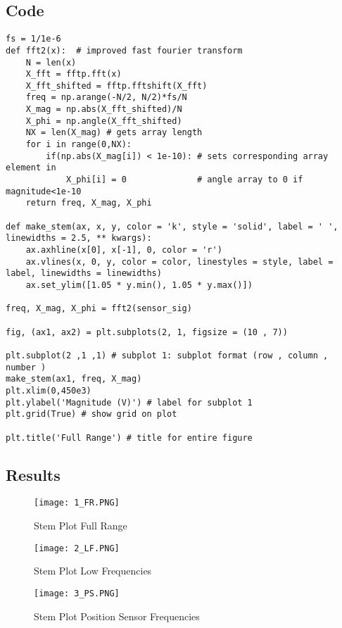 \subsection{Code}

\begin{scriptsize}
\begin{lstlisting}
fs = 1/1e-6
def fft2(x):  # improved fast fourier transform
    N = len(x)
    X_fft = fftp.fft(x)
    X_fft_shifted = fftp.fftshift(X_fft)
    freq = np.arange(-N/2, N/2)*fs/N
    X_mag = np.abs(X_fft_shifted)/N
    X_phi = np.angle(X_fft_shifted)
    NX = len(X_mag) # gets array length
    for i in range(0,NX):
        if(np.abs(X_mag[i]) < 1e-10): # sets corresponding array element in 
            X_phi[i] = 0              # angle array to 0 if magnitude<1e-10  
    return freq, X_mag, X_phi

def make_stem(ax, x, y, color = 'k', style = 'solid', label = ' ', linewidths = 2.5, ** kwargs):
    ax.axhline(x[0], x[-1], 0, color = 'r')
    ax.vlines(x, 0, y, color = color, linestyles = style, label = label, linewidths = linewidths)
    ax.set_ylim([1.05 * y.min(), 1.05 * y.max()])
    
freq, X_mag, X_phi = fft2(sensor_sig)

fig, (ax1, ax2) = plt.subplots(2, 1, figsize = (10 , 7))

plt.subplot(2 ,1 ,1) # subplot 1: subplot format (row , column , number )
make_stem(ax1, freq, X_mag)
plt.xlim(0,450e3)
plt.ylabel('Magnitude (V)') # label for subplot 1
plt.grid(True) # show grid on plot

plt.title('Full Range') # title for entire figure 
\end{lstlisting}
\end{scriptsize}

\subsection{Results}
 \begin{figure}[H]
   \centering
   \texttt{[image: 1\_FR.PNG]}
   \caption{Stem Plot Full Range}
 \end{figure}
 

  \begin{figure}[H]
    \centering
    \texttt{[image: 2\_LF.PNG]}
    \caption{Stem Plot Low Frequencies}
  \end{figure}
  

   \begin{figure}[H]
     \centering
     \texttt{[image: 3\_PS.PNG]}
     \caption{Stem Plot Position Sensor Frequencies}
   \end{figure}
   

